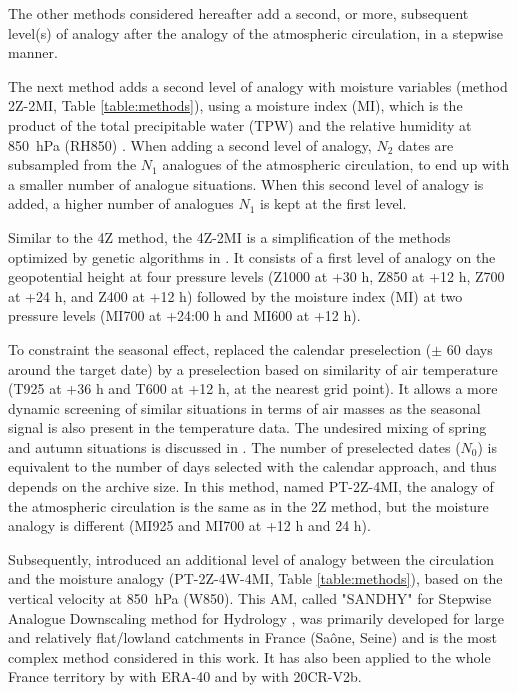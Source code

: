 \documentclass[smallextended]{svjour3}       %
\begin{document}
	The other methods considered hereafter add a second, or more, subsequent level(s) of analogy after the analogy of the atmospheric circulation, in a stepwise manner.
	
	The next method adds a second level of analogy with moisture variables (method 2Z-2MI, Table \ref{table:methods}), using a moisture index (MI), which is the product of the total precipitable water (TPW) and the relative humidity at 850~hPa (RH850) \citep{Bontron2004}. When adding a second level of analogy, $N_{2}$ dates are subsampled from the $N_{1}$ analogues of the atmospheric circulation, to end up with a smaller number of analogue situations. When this second level of analogy is added, a higher number of analogues $N_{1}$ is kept at the first level. 
	
	Similar to the 4Z method, the 4Z-2MI is a simplification of the methods optimized by genetic algorithms in \citet{Horton2017b}. It consists of a first level of analogy on the geopotential height at four pressure levels (Z1000 at +30 h, Z850 at +12 h, Z700 at +24 h, and Z400 at +12 h) followed by the moisture index (MI) at two pressure levels (MI700 at +24:00 h and MI600 at +12 h).
	
	To constraint the seasonal effect, \citet{BenDaoud2016} replaced the calendar preselection ($\pm$ 60 days around the target date) by a preselection based on similarity of air temperature (T925 at +36 h and T600 at +12 h, at the nearest grid point). It allows a more dynamic screening of similar situations in terms of air masses as the seasonal signal is also present in the temperature data. The undesired mixing of spring and autumn situations is discussed in \citet{Caillouet2016}. The number of preselected dates ($N_{0}$) is equivalent to the number of days selected with the calendar approach, and thus depends on the archive size. In this method, named PT-2Z-4MI, the analogy of the atmospheric circulation is the same as in the 2Z method, but the moisture analogy is different (MI925 and MI700 at +12 h and 24 h).
	
	Subsequently, \citet{BenDaoud2016} introduced an additional level of analogy between the circulation and the moisture analogy (PT-2Z-4W-4MI, Table \ref{table:methods}), based on the vertical velocity at 850~hPa (W850). This AM, called "SANDHY" for Stepwise Analogue Downscaling method for Hydrology \citep{BenDaoud2016, Caillouet2016}, was primarily developed for large and relatively flat/lowland catchments in France (Sa\^{o}ne, Seine) and is the most complex method considered in this work. It has also been applied to the whole France territory by \citet{Radanovics2013} with ERA-40 and by \cite{Caillouet2016} with 20CR-V2b.
	
\end{document}
